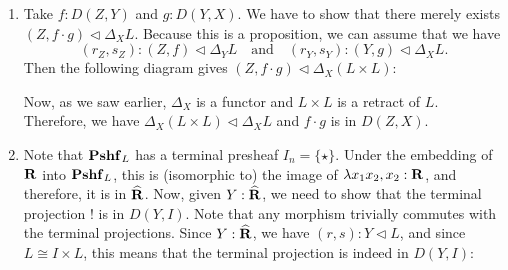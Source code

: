 \begin{enumerate}
  \item Take $ f: D(Z, Y) $ and $ g: D(Y, X) $. We have to show that there merely exists $ (Z, f \cdot g) \triangleleft \Delta_X L $. Because this is a proposition, we can assume that we have
  \[ (r_Z, s_Z) : (Z, f) \triangleleft \Delta_Y L \quad \text{and} \quad (r_Y, s_Y) : (Y, g) \triangleleft \Delta_X L. \]
  Then the following diagram gives $ (Z, f \cdot g) \triangleleft \Delta_X (L \times L) $:
    \begin{center}
    \end{center}
    Now, as we saw earlier, $ \Delta_X $ is a functor and $ L \times L $ is a retract of $ L $. Therefore, we have $ \Delta_X (L \times L) \triangleleft \Delta_X L $ and $ f \cdot g $ is in $ D(Z, X) $.



  \item Note that $ \mathbf{Pshf}_{L} $ has a terminal presheaf $ I_n = \{ \star \} $. Under the embedding of $ \mathbf{R} $ into $ \mathbf{Pshf}_{L} $, this is (isomorphic to) the image of $ \lambda x_1 x_2, x_2 : \mathbf{R} $, and therefore, it is in $ \widehat {\mathbf{R}} $. Now, given $ Y : \widehat {\mathbf{R}} $, we need to show that the terminal projection $ ! $ is in $ D(Y, I) $. Note that any morphism trivially commutes with the terminal projections. Since $ Y : \widehat {\mathbf{R}} $, we have $ (r, s) : Y \triangleleft L $, and since $ L \cong I \times L $, this means that the terminal projection is indeed in $ D(Y, I) $:
    \begin{center}
    \end{center}
\end{enumerate}

